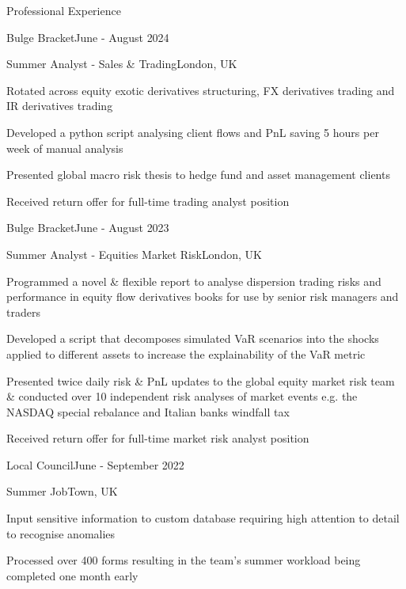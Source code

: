 \documentclass[10pt,a4paper]{CV}
\begin{document}
\begin{Section}{Professional Experience}
    \begin{Institution}{Bulge Bracket}{June - August 2024}
        \begin{Position}{Summer Analyst - Sales \& Trading}{London, UK}
            \item Rotated across equity exotic derivatives structuring, FX derivatives trading and IR derivatives trading
            \item Developed a python script analysing client flows and PnL saving 5 hours per week of manual analysis
            \item Presented global macro risk thesis to hedge fund and asset management clients
            \item Received return offer for full-time trading analyst position
        \end{Position}
    \end{Institution}
    
    \begin{Institution}{Bulge Bracket}{June - August 2023}
        \begin{Position}{Summer Analyst - Equities Market Risk}{London, UK}
            \item Programmed a novel \& flexible report to analyse dispersion trading risks and performance in equity flow derivatives books for use by senior risk managers and traders
            \item Developed a script that decomposes simulated VaR scenarios into the shocks applied to different assets to increase the explainability of the VaR metric
            \item Presented twice daily risk \& PnL updates to the global equity market risk team \& conducted over 10 independent risk analyses of market events e.g. the NASDAQ special rebalance and Italian banks windfall tax
            \item Received return offer for full-time market risk analyst position
        \end{Position}
    \end{Institution}
    
    \begin{Institution}{Local Council}{June - September 2022}
        \begin{Position}{Summer Job}{Town, UK}
            \item Input sensitive information to custom database requiring high attention to detail to recognise anomalies
            \item Processed over 400 forms resulting in the team’s summer workload being completed one month early
        \end{Position}
    \end{Institution}
\end{Section}
\end{document}

